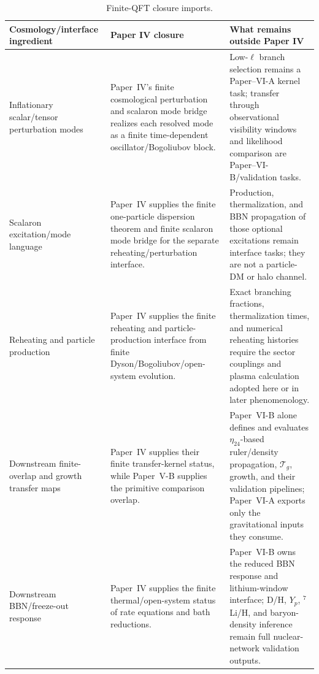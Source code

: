 \documentclass[12pt,a4paper]{article}
\begin{document}
\begin{table}[H]
\centering
\small
\renewcommand{\arraystretch}{1.12}
\begin{tabularx}{\textwidth}{@{}>{\raggedright\arraybackslash}X>{\raggedright\arraybackslash}X>{\raggedright\arraybackslash}X@{}}
\toprule
\textbf{Cosmology/interface ingredient} & \textbf{Paper IV closure} & \textbf{What remains outside Paper IV} \\
\midrule
Inflationary scalar/tensor perturbation modes & Paper~IV's finite cosmological perturbation and scalaron mode bridge realizes each resolved mode as a finite time-dependent oscillator/Bogoliubov block. & Low-$\ell$ branch selection remains a Paper--VI-A kernel task; transfer through observational visibility windows and likelihood comparison are Paper--VI-B/validation tasks. \\
Scalaron excitation/mode language & Paper~IV supplies the finite one-particle dispersion theorem and finite scalaron mode bridge for the separate reheating/perturbation interface. & Production, thermalization, and BBN propagation of those optional excitations remain interface tasks; they are not a particle-DM or halo channel. \\
Reheating and particle production & Paper~IV supplies the finite reheating and particle-production interface from finite Dyson/Bogoliubov/open-system evolution. & Exact branching fractions, thermalization times, and numerical reheating histories require the sector couplings and plasma calculation adopted here or in later phenomenology. \\
Downstream finite-overlap and growth transfer maps & Paper~IV supplies their finite transfer-kernel status, while Paper~V-B supplies the primitive comparison overlap. & Paper~VI-B alone defines and evaluates $\eta_{24}$-based ruler/density propagation, $\mathcal T_g$, growth, and their validation pipelines; Paper~VI-A exports only the gravitational inputs they consume. \\
Downstream BBN/freeze-out response & Paper~IV supplies the finite thermal/open-system status of rate equations and bath reductions. & Paper~VI-B owns the reduced BBN response and lithium-window interface; D/H, $Y_p$, $^7$Li/H, and baryon-density inference remain full nuclear-network validation outputs. \\
\bottomrule
\end{tabularx}
\caption[Finite-QFT closure imports]{Finite-QFT closure imports.}
\label{p8:tab:p4-closures}
\end{table}
\end{document}
